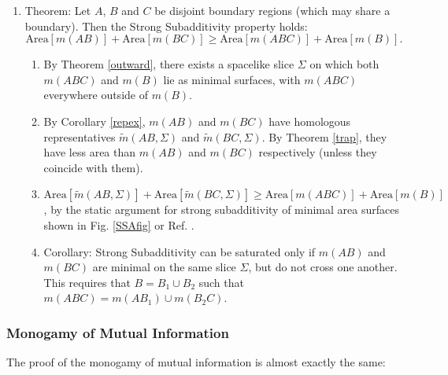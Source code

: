 \documentclass[12pt]{article}
\begin{document}
\begin{enumerate}[resume]
\item \label{SSA} Theorem: Let $A$, $B$ and $C$ be disjoint boundary regions (which may share a boundary).  Then the Strong Subadditivity property holds:
\begin{equation}
\mathrm{Area}[m(AB)] + \mathrm{Area}[m(BC)] \ge \mathrm{Area}[m(ABC)] + \mathrm{Area}[m(B)].
\end{equation}
	\begin{enumerate}
	\item By Theorem \ref{outward}, there exists a spacelike slice $\Sigma$ on which both $m(ABC)$ and $m(B)$ lie as minimal surfaces, with $m(ABC)$ everywhere outside of $m(B)$.  
	\item By Corollary \ref{repex}, $m(AB)$ and $m(BC)$ have homologous representatives $\tilde{m}(AB,\Sigma)$ and $\tilde{m}(BC,\Sigma)$. By Theorem \ref{trap}, they have less area than $m(AB)$ and $m(BC)$ respectively (unless they coincide with them).
	\item $\mathrm{Area}[\tilde{m}(AB,\Sigma)] + \mathrm{Area}[\tilde{m}(BC,\Sigma)] \ge \mathrm{Area}[m(ABC)] + \mathrm{Area}[m(B)]$, by the static argument for strong subadditivity of minimal area surfaces shown in Fig. \ref{SSAfig} or Ref. \cite{HT07}.
	\item Corollary: Strong Subadditivity can be saturated only if $m(AB)$ and $m(BC)$ are minimal on the same slice $\Sigma$, but do not cross one another.  This requires that $B = B_1 \cup B_2$ such that $m(ABC) = m(AB_1) \cup m(B_2C)$.  
	\end{enumerate}
\end{enumerate}

\subsubsection{Monogamy of Mutual Information}\label{MONO}

The proof of the monogamy of mutual information is almost exactly the same:
\end{document}
